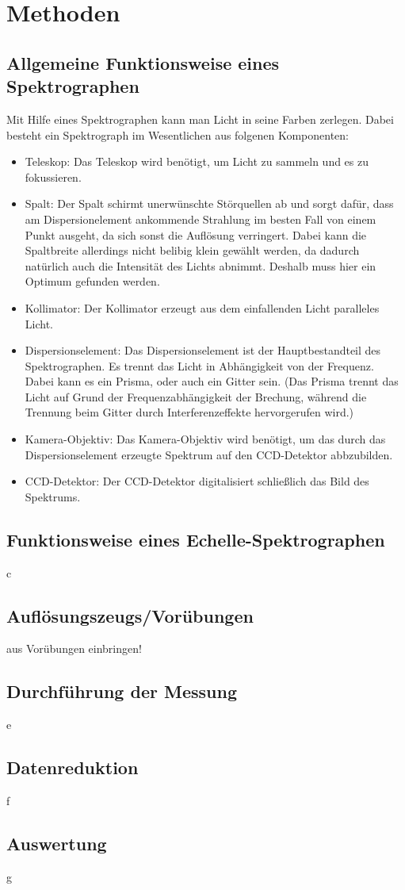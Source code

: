 \section{Methoden}

\subsection{Allgemeine Funktionsweise eines Spektrographen}
Mit Hilfe eines Spektrographen kann man Licht in seine Farben zerlegen. Dabei besteht ein Spektrograph im Wesentlichen aus folgenen Komponenten:

\begin{itemize}

\item Teleskop: Das Teleskop wird benötigt, um Licht zu sammeln und es zu fokussieren.

\item Spalt: Der Spalt schirmt unerwünschte Störquellen ab und sorgt dafür, dass am Dispersionelement ankommende Strahlung im besten Fall von einem Punkt ausgeht, da sich sonst die Auflösung verringert. Dabei kann die Spaltbreite allerdings nicht belibig klein gewählt  werden, da dadurch natürlich auch die Intensität des Lichts abnimmt. Deshalb muss hier ein Optimum gefunden werden.

\item Kollimator: Der Kollimator erzeugt aus dem einfallenden Licht paralleles Licht.

\item Dispersionselement: Das Dispersionselement ist der Hauptbestandteil des Spektrographen. Es trennt das Licht in Abhängigkeit von der Frequenz. Dabei kann es ein Prisma, oder auch ein Gitter sein. (Das Prisma trennt das Licht auf Grund der Frequenzabhängigkeit der Brechung, während die Trennung beim Gitter durch Interferenzeffekte hervorgerufen wird.)

\item Kamera-Objektiv: Das Kamera-Objektiv wird benötigt, um das durch das Dispersionselement erzeugte Spektrum auf den CCD-Detektor abbzubilden.

\item CCD-Detektor: Der CCD-Detektor digitalisiert schließlich das Bild des Spektrums.

\end{itemize}


\subsection{Funktionsweise eines Echelle-Spektrographen}
c

\subsection{Auflösungszeugs/Vorübungen}
aus Vorübungen einbringen!

\subsection{Durchführung der Messung}
e

\subsection{Datenreduktion}
f

\subsection{Auswertung}
g

